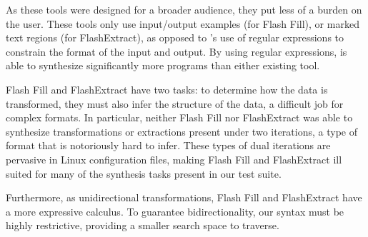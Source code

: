 \documentclass[sigplan,acmsmall]{acmart}
\begin{document}
As these tools were designed for a broader audience, they put less of a burden
on the user.  These tools only use input/output examples (for Flash
Fill), or marked text regions (for FlashExtract), as opposed
to \Optician{}'s use of regular expressions to constrain the format of
the input and output.  By using regular expressions,
\Optician{} is able to synthesize significantly more programs
than either existing tool.

Flash Fill and FlashExtract have two tasks: to determine how
the data is transformed, they must also infer the structure of the data, a
difficult job for complex formats.
In particular, neither Flash Fill nor FlashExtract was able to synthesize
transformations or extractions present under two iterations, a type of format
that is notoriously hard to infer.
These types of dual iterations are pervasive in Linux configuration
files, making Flash Fill and FlashExtract ill suited for many of the synthesis
tasks present in our test suite.

Furthermore, as unidirectional transformations, Flash Fill and FlashExtract have
a more expressive calculus.  To guarantee bidirectionality, our syntax must be
highly restrictive, providing a smaller search space to traverse.


\end{document}
